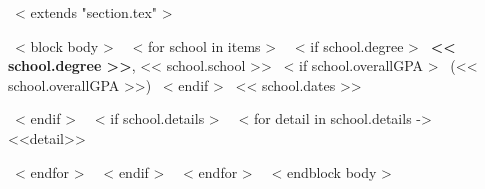 ~< extends "section.tex" >~

~< block body >~
~< for school in items >~
  ~< if school.degree >~
    \textbf{<< school.degree >>}, << school.school >>
    ~< if school.overallGPA >~
        (<< school.overallGPA >>)
    ~< endif >~
    \hfill << school.dates >> \par
  ~< endif >~
  ~< if school.details >~
    ~< for detail in school.details ->~
        <<detail>> \par
    ~< endfor >~
  ~< endif >~
  \vspace{3mm}
~< endfor >~
\vspace{-3mm}
~< endblock body >~
